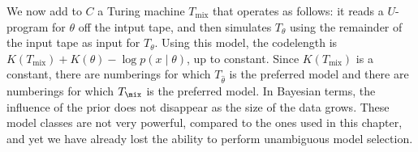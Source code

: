 We now add to $C$ a Turing machine $T_\text{mix}$ that operates as follows: it reads a $U$-program for $\theta$ off the intput tape, and then simulates $T_\theta$ using the remainder of the input tape as input for $T_\theta$. Using this model, the codelength is $K(T_\text{mix}) + K(\theta) - \log p(x\mid \theta)$, up to constant. Since $K(T_\text{mix})$ is a constant, there are numberings for which $T_{\hat\theta}$ is the preferred model and there are numberings for which $T_\mix$ is the preferred model. In Bayesian terms, the influence of the prior does not disappear as the size of the data grows. These model classes are not very powerful, compared to the ones used in this chapter, and yet we have already lost the ability to perform unambiguous model selection.  


